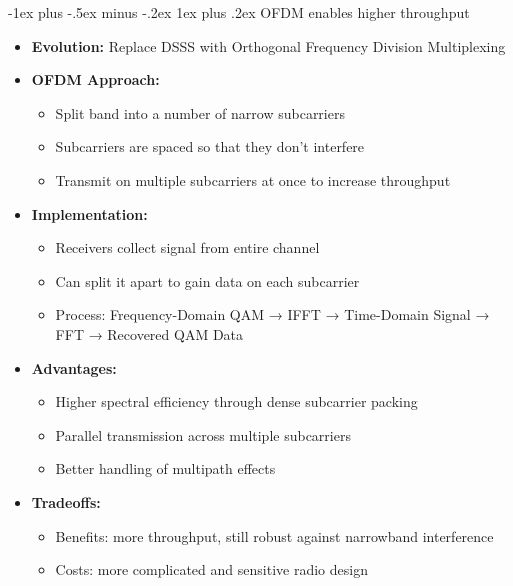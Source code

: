 \documentclass[10pt,landscape]{article}
\makeatletter
\newcommand{\subsubsubsection}{\@startsection{subsubsection}{3}{0mm}%
                                {-1ex plus -.5ex minus -.2ex}%
                                {1ex plus .2ex}%
                                {\normalfont\scriptsize\bfseries}}
\newcommand{\1}{\mathmybb{1}}
\makeatother
\begin{document}
\begin{multicols*}{3}
\subsubsubsection{OFDM enables higher throughput}
\begin{itemize}
  \item \textbf{Evolution:} Replace DSSS with Orthogonal Frequency Division Multiplexing
  \item \textbf{OFDM Approach:}
  \begin{itemize}
    \item Split band into a number of narrow subcarriers
    \item Subcarriers are spaced so that they don't interfere
    \item Transmit on multiple subcarriers at once to increase throughput
  \end{itemize}
  \item \textbf{Implementation:}
  \begin{itemize}
    \item Receivers collect signal from entire channel
    \item Can split it apart to gain data on each subcarrier
    \item Process: Frequency-Domain QAM → IFFT → Time-Domain Signal → FFT → Recovered QAM Data
  \end{itemize}
  \item \textbf{Advantages:}
  \begin{itemize}
    \item Higher spectral efficiency through dense subcarrier packing
    \item Parallel transmission across multiple subcarriers
    \item Better handling of multipath effects
  \end{itemize}
  \item \textbf{Tradeoffs:}
  \begin{itemize}
    \item Benefits: more throughput, still robust against narrowband interference
    \item Costs: more complicated and sensitive radio design
  \end{itemize}
\end{itemize}


\end{multicols*}
\end{document}
